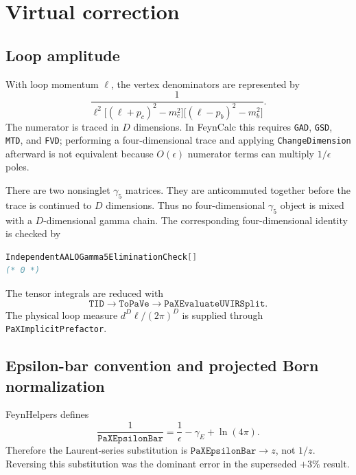 \documentclass[11pt]{article}
\begin{document}
\section{Virtual correction}

\subsection{Loop amplitude}

With loop momentum \(\ell\), the vertex denominators are represented by
\begin{equation}
 \frac{1}{
 \ell^2\big[(\ell+p_c)^2-m_c^2\big]
 \big[(\ell-p_b)^2-m_b^2\big]} .
\end{equation}
The numerator is traced in \(D\) dimensions.  In FeynCalc this requires
\texttt{GAD}, \texttt{GSD}, \texttt{MTD}, and \texttt{FVD}; performing a
four-dimensional trace and applying \texttt{ChangeDimension} afterward is
not equivalent because \(O(\epsilon)\) numerator terms can multiply
\(1/\epsilon\) poles.

There are two nonsinglet \(\gamma_5\) matrices.  They are anticommuted
together before the trace is continued to \(D\) dimensions.  Thus no
four-dimensional \(\gamma_5\) object is mixed with a \(D\)-dimensional gamma
chain.  The corresponding four-dimensional identity is checked by
\begin{lstlisting}[language=Mathematica]
IndependentAALOGamma5EliminationCheck[]
(* 0 *)
\end{lstlisting}

The tensor integrals are reduced with
\begin{equation}
 \texttt{TID}\longrightarrow\texttt{ToPaVe}
 \longrightarrow\texttt{PaXEvaluateUVIRSplit}.
\end{equation}
The physical loop measure \(d^D\ell/(2\pi)^D\) is supplied through
\texttt{PaXImplicitPrefactor}.

\subsection{Epsilon-bar convention and projected Born normalization}

FeynHelpers defines
\begin{equation}
 \frac{1}{\texttt{PaXEpsilonBar}}
 =\frac{1}{\epsilon}-\gamma_E+\ln(4\pi).
\end{equation}
Therefore the Laurent-series substitution is
\(\texttt{PaXEpsilonBar}\to z\), not \(1/z\).  Reversing this substitution
was the dominant error in the superseded \(+3\%\) result.
\end{document}
